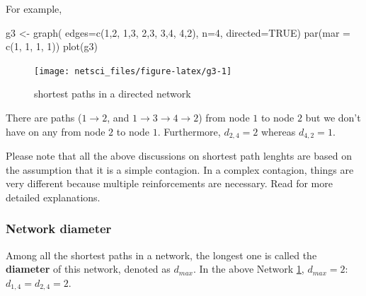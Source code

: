 \documentclass[
]{krantz}
\makeatletter
\newenvironment{Shaded}{\begin{snugshade}}{\end{snugshade}}
\newcommand{\AttributeTok}[1]{\textcolor[rgb]{0.61,0.61,0.61}{#1}}
\newcommand{\ConstantTok}[1]{\textcolor[rgb]{0,0,0}{#1}}
\newcommand{\DecValTok}[1]{\textcolor[rgb]{0.06,0.06,0.06}{#1}}
\newcommand{\FunctionTok}[1]{\textcolor[rgb]{0,0,0}{#1}}
\newcommand{\NormalTok}[1]{#1}
\newcommand{\OtherTok}[1]{\textcolor[rgb]{0.37,0.37,0.37}{#1}}
\newenvironment{kframe}{%
\medskip{}
\setlength{\fboxsep}{.8em}
 \def\at@end@of@kframe{}%
 \ifinner\ifhmode%
  \def\at@end@of@kframe{\end{minipage}}%
  \begin{minipage}{\columnwidth}%
 \fi\fi%
 \def\FrameCommand##1{\hskip\@totalleftmargin \hskip-\fboxsep
 \colorbox{shadecolor}{##1}\hskip-\fboxsep
     \hskip-\linewidth \hskip-\@totalleftmargin \hskip\columnwidth}%
 \MakeFramed {\advance\hsize-\width
   \@totalleftmargin\z@ \linewidth\hsize
   \@setminipage}}%
 {\par\unskip\endMakeFramed%
 \at@end@of@kframe}
\renewenvironment{Shaded}{\begin{kframe}}{\end{kframe}}
\newenvironment{rmdblock}[1]
  {
  \begin{itemize}
  \renewcommand{\labelitemi}{
    \raisebox{-.7\height}[0pt][0pt]{
      {\setkeys{Gin}{width=3em,keepaspectratio}\texttt{[image: images/\#1]}}
    }
  }
  \setlength{\fboxsep}{1em}
  \begin{kframe}
  \item
  }
  {
  \end{kframe}
  \end{itemize}
  }
\newenvironment{rmdimportant}
  {\begin{rmdblock}{important}}
  {\end{rmdblock}}
\makeatother
\begin{document}
For example,

\begin{Shaded}
\begin{Highlighting}[]
\NormalTok{g3 }\OtherTok{\textless{}{-}} \FunctionTok{graph}\NormalTok{( }\AttributeTok{edges=}\FunctionTok{c}\NormalTok{(}\DecValTok{1}\NormalTok{,}\DecValTok{2}\NormalTok{, }\DecValTok{1}\NormalTok{,}\DecValTok{3}\NormalTok{, }\DecValTok{2}\NormalTok{,}\DecValTok{3}\NormalTok{, }\DecValTok{3}\NormalTok{,}\DecValTok{4}\NormalTok{, }\DecValTok{4}\NormalTok{,}\DecValTok{2}\NormalTok{), }\AttributeTok{n=}\DecValTok{4}\NormalTok{, }\AttributeTok{directed=}\ConstantTok{TRUE}\NormalTok{)}
\FunctionTok{par}\NormalTok{(}\AttributeTok{mar =} \FunctionTok{c}\NormalTok{(}\DecValTok{1}\NormalTok{, }\DecValTok{1}\NormalTok{, }\DecValTok{1}\NormalTok{, }\DecValTok{1}\NormalTok{))}
\FunctionTok{plot}\NormalTok{(g3)}
\end{Highlighting}
\end{Shaded}

\begin{figure}

{\centering \texttt{[image: netsci\_files/figure-latex/g3-1]} 

}

\caption{shortest paths in a directed network}\label{fig:g3}
\end{figure}

There are paths (\(1 \to 2\), and \(1 \to 3 \to 4 \to 2\)) from node \(1\) to node \(2\) but we don't have on any from node \(2\) to node \(1\). Furthermore, \(d_{2, 4} = 2\) whereas \(d_{4,2} = 1\).

\begin{rmdimportant}
Please note that all the above discussions on shortest path lenghts are based on the assumption that it is a simple contagion. In a complex contagion, things are very different because multiple reinforcements are necessary. Read \citet{centola2007complex} for more detailed explanations.
\end{rmdimportant}

\hypertarget{network-diameter}{%
\subsubsection{Network diameter}\label{network-diameter}}

Among all the shortest paths in a network, the longest one is called the \textbf{diameter} of this network, denoted as \(d_{max}\). In the above Network \ref{fig:g3}, \(d_{max} = 2\): \(d_{1,4} = d_{2,4} = 2\).
\end{document}
